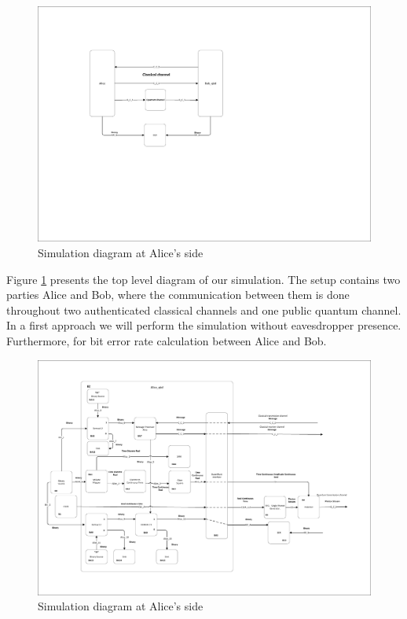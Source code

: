\begin{refsection}
\begin{figure}[H]
    \centering
        \includegraphics[clip, trim=1cm 8cm 10cm 3cm, width=1.00\textwidth]{./sdf/bb84_with_discrete_variables/figures/Simulation_toplevel_implemented.pdf}
    \caption{Simulation diagram at Alice's side}\label{simulationimplemented}
\end{figure}


Figure \ref{simulationimplemented} presents the top level diagram of our simulation. The setup contains two parties Alice and Bob, where the communication between them is done throughout two authenticated classical channels and one public quantum channel. In a first approach we will perform the simulation without eavesdropper presence. Furthermore, for bit error rate calculation between Alice and Bob.

\begin{figure}[h]
    \centering
        \includegraphics[clip, trim=0.5cm 1cm 0.5cm 1cm, width=1.10\textwidth]{./sdf/bb84_with_discrete_variables/figures/Simulation_Alice_bb84.pdf}
    \caption{Simulation diagram at Alice's side}\label{alicesimulation}
\end{figure}



\end{refsection}
